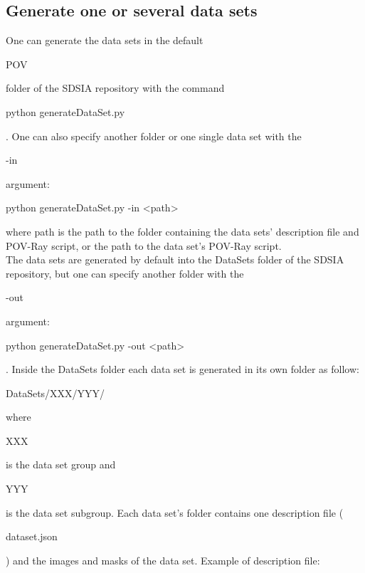 \subsection{Generate one or several data sets}

One can generate the data sets in the default \begin{ttfamily}POV\end{ttfamily} folder of the SDSIA repository with the command \begin{ttfamily}python generateDataSet.py\end{ttfamily}. One can also specify another folder or one single data set with the \begin{ttfamily}-in\end{ttfamily} argument: \begin{ttfamily}python generateDataSet.py -in <path>\end{ttfamily} where path is the path to the folder containing the data sets' description file and POV-Ray script, or the path to the data set's POV-Ray script.\\

The data sets are generated by default into the DataSets folder of the SDSIA repository, but one can specify another folder with the \begin{ttfamily}-out\end{ttfamily} argument: \begin{ttfamily}python generateDataSet.py -out <path>\end{ttfamily} . Inside the DataSets folder each data set is generated in its own folder as follow: \begin{ttfamily}DataSets/XXX/YYY/\end{ttfamily} where \begin{ttfamily}XXX\end{ttfamily} is the data set group and \begin{ttfamily}YYY\end{ttfamily} is the data set subgroup. Each data set's folder contains one description file (\begin{ttfamily}dataset.json\end{ttfamily}) and the images and masks of the data set. Example of description file:\\
\begin{scriptsize}
\begin{ttfamily}

\end{ttfamily}
\end{scriptsize}

